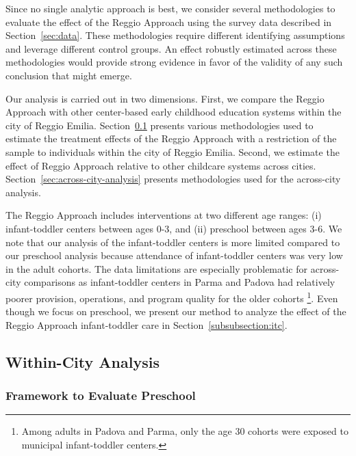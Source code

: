 Since no single analytic approach is best, we consider several methodologies to evaluate the effect of the Reggio Approach using the survey data described in Section~\ref{sec:data}. These methodologies require different identifying assumptions and leverage different control groups. An effect robustly estimated across these methodologies would provide strong evidence in favor of the validity of any such conclusion that might emerge.

Our analysis is carried out in two dimensions. First, we compare the Reggio Approach with other center-based early childhood education systems within the city of Reggio Emilia. Section~\ref{sec:within-city-analysis} presents various methodologies used to estimate the treatment effects of the Reggio Approach with a restriction of the sample to individuals within the city of Reggio Emilia. Second, we estimate the effect of Reggio Approach relative to other childcare systems across cities. Section~\ref{sec:across-city-analysis} presents methodologies used for the across-city analysis.

The Reggio Approach includes interventions at two different age ranges: (i) infant-toddler centers between ages 0-3, and (ii) preschool between ages 3-6. We note that our analysis of the infant-toddler centers is more limited compared to our preschool analysis because attendance of infant-toddler centers was very low in the adult cohorts. The data limitations are especially problematic for across-city comparisons as infant-toddler centers in Parma and Padova had relatively poorer provision, operations, and program quality for the older cohorts \footnote{Among adults in Padova and Parma, only the age 30 cohorts were exposed to municipal infant-toddler centers.}. Even though we focus on preschool, we present our method to analyze the effect of the Reggio Approach infant-toddler care in Section~\ref{subsubsection:itc}.

\subsection{Within-City Analysis} \label{sec:within-city-analysis}

\subsubsection{Framework to Evaluate Preschool} 
\label{subsubsection:OLS-Preschool}


